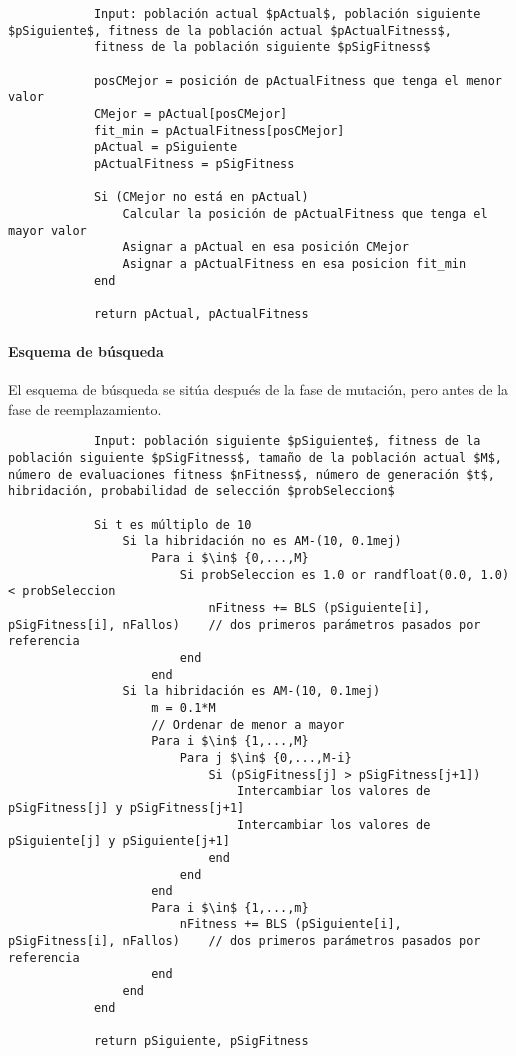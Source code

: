 		\footnotesize 
		\begin{lstlisting}
			Input: población actual $pActual$, población siguiente $pSiguiente$, fitness de la población actual $pActualFitness$, 
			fitness de la población siguiente $pSigFitness$

			posCMejor = posición de pActualFitness que tenga el menor valor 
			CMejor = pActual[posCMejor]
			fit_min = pActualFitness[posCMejor]
			pActual = pSiguiente 
			pActualFitness = pSigFitness

			Si (CMejor no está en pActual)
				Calcular la posición de pActualFitness que tenga el mayor valor 
				Asignar a pActual en esa posición CMejor 
				Asignar a pActualFitness en esa posicion fit_min
			end

			return pActual, pActualFitness
		\end{lstlisting}
		\normalsize

		\paragraph{Esquema de búsqueda}
		$ $\\
		El esquema de búsqueda se sitúa después de la fase de mutación, pero antes de la fase de reemplazamiento.
		
		\footnotesize 
		\begin{lstlisting}
			Input: población siguiente $pSiguiente$, fitness de la población siguiente $pSigFitness$, tamaño de la población actual $M$, número de evaluaciones fitness $nFitness$, número de generación $t$, hibridación, probabilidad de selección $probSeleccion$

			Si t es múltiplo de 10
				Si la hibridación no es AM-(10, 0.1mej)
					Para i $\in$ {0,...,M}
						Si probSeleccion es 1.0 or randfloat(0.0, 1.0) < probSeleccion 
							nFitness += BLS (pSiguiente[i], pSigFitness[i], nFallos) 	// dos primeros parámetros pasados por referencia
						end
					end
				Si la hibridación es AM-(10, 0.1mej)
					m = 0.1*M
					// Ordenar de menor a mayor
					Para i $\in$ {1,...,M}
						Para j $\in$ {0,...,M-i}
							Si (pSigFitness[j] > pSigFitness[j+1])
								Intercambiar los valores de pSigFitness[j] y pSigFitness[j+1]
								Intercambiar los valores de pSiguiente[j] y pSiguiente[j+1]
							end 
						end 
					end
					Para i $\in$ {1,...,m}
						nFitness += BLS (pSiguiente[i], pSigFitness[i], nFallos) 	// dos primeros parámetros pasados por referencia
					end
				end
			end 

			return pSiguiente, pSigFitness
		\end{lstlisting}
		\normalsize

